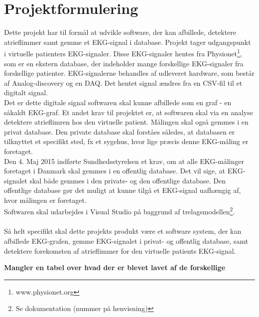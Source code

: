 \chapter{Projektformulering}

Dette projekt har til formål at udvikle software, der kan afbillede, detektere atrieflimmer samt gemme et EKG-signal i database. Projekt tager udgangspunkt i virtuelle patienters EKG-signaler. Disse EKG-signaler hentes fra Physionet\footnote{www.physionet.org}, som er en ekstern database, der indeholder mange forskellige EKG-signaler fra forskellige patienter. EKG-signalerne behandles af udleveret hardware, som består af Analog-discovery og en DAQ. Det hentet signal ændres fra en CSV-fil til et digitalt signal. \\
Det er dette digitale signal softwaren skal kunne afbillede som en graf - en såkaldt EKG-graf. Et andet krav til projektet er, at softwaren skal via en analyse detektere atrieflimren hos den virtuelle patient. Målingen skal også gemmes i en privat database. Den private database skal forståes således, at databasen er tilknyttet et specifikt sted, fx et sygehus, hvor lige præcis denne EKG-måling er foretaget. \\
Den 4. Maj 2015 indførte Sundhedsstyrelsen et krav, om at alle EKG-målinger foretaget i Danmark skal gemmes i en offentlig database. Det vil sige, at EKG-signalet skal både gemmes i den private- og den offentlige database. Den offentlige database gør det muligt at kunne tilgå et EKG-signal uafhængig af, hvor målingen er foretaget.\\
Softwaren skal udarbejdes i Visual Studio på baggrund af trelagsmodellen\footnote{Se dokumentation (nummer på henvisning)}.\\ \\
Så helt specifikt skal dette projekts produkt være et software system, der kan afbillede EKG-grafen, gemme EKG-signalet i privat- og offentlig database, samt detektere forekomsten af atrieflimmer for den virtuelle patients EKG-signal.  

\textbf{Mangler en tabel over hvad der er blevet lavet af de forskellige}